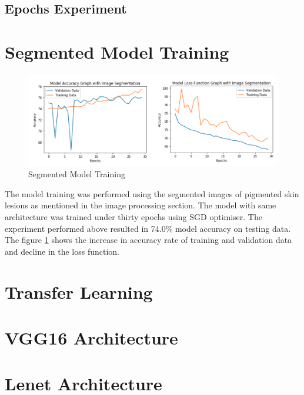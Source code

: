 \subsection{Epochs Experiment}


\section{Segmented Model Training}
\begin{figure}[!htp]
    \centering
    \includegraphics[width=\textwidth]{Images/segmented.png}
    \caption{Segmented Model Training}
    \label{fig:segmodel}
\end{figure}
The model training was performed using the segmented images of pigmented skin lesions as mentioned in the 
image processing section. The model with same architecture was trained under thirty epochs using SGD optimiser. The experiment performed above resulted in 74.0\% model 
accuracy on testing data. The figure \ref{fig:segmodel} shows the increase in accuracy rate of training and 
validation data and decline in the loss function.

\pagebreak
\section{Transfer Learning}

\pagebreak
\section{VGG16 Architecture}

\pagebreak
\section{Lenet Architecture}

\pagebreak
